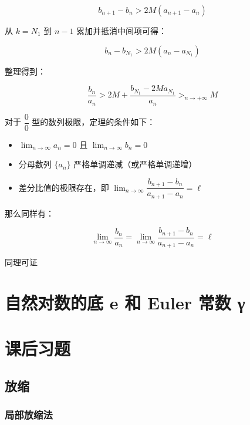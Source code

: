 $$
\displaystyle b_{n+1} - b_n > 2M(a_{n+1} - a_n)
$$

从 $\displaystyle k = N_1$ 到 $\displaystyle n-1$ 累加并抵消中间项可得：

$$
\displaystyle b_n - b_{N_1} > 2M(a_n - a_{N_1})
$$

整理得到：

$$
\displaystyle \dfrac{b_n}{a_n} > 2M + \dfrac{b_{N_1} - 2M a_{N_1}}{a_n}>_{n \to+\infty}M
$$

\begin{theorem}

\label{Stolz0}对于 $\displaystyle\dfrac{0}{0}$ 型的数列极限，定理的条件如下：

\begin{itemize}
  \item {$\displaystyle\lim_{n \to \infty} a_n = 0$ 且 $\displaystyle\lim_{n \to \infty} b_n = 0$}\item {分母数列 $\displaystyle\lbrace a_n \displaystyle\rbrace$ 严格单调递减（或严格单调递增）}\item {差分比值的极限存在，即 $\displaystyle\lim_{n \to \infty} \dfrac{b_{n+1} - b_n}{a_{n+1} - a_n} = \ell$}
\end{itemize}

那么同样有：

\begin{equation}\displaystyle\lim_{n \to \infty}\displaystyle\dfrac{b_n}{a_n} =\lim_{n \to \infty} \dfrac{b_{n+1} - b_n}{a_{n+1} - a_n} = \ell\end{equation}

\end{theorem}

同理可证

\section{自然对数的底 e 和 Euler 常数 γ}

\section{课后习题}

\subsection{放缩}

\subsubsection{局部放缩法}

